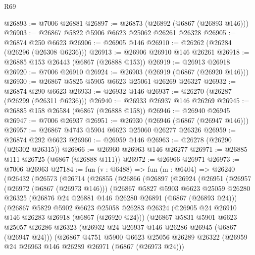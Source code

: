 \begin{lexlean}{R69}
\begin{coremodule}
{@26893 := @7006 @26881
@26897 := @26873 (@26892 (@6867 (@26893 @146)))
@26903 := @26867 @5822 @5906 @6623 @25062 @26261 @26328
@26905 := @26874 @250 @6623
@26906 := @26905 @146
@26910 := @26262 (@26284 (@26296 (@26308 @6236)))
@26913 := @26906 @26910 @146 @26261
@26918 := @26885 @153 @26443 (@6867 (@26888 @153))
@26919 := @26913 @26918
@26920 := @7006 @26910
@26924 := @26903 (@26919 (@6867 (@26920 @146)))
@26930 := @26867 @5825 @5905 @6623 @25061 @26269 @26327
@26932 := @26874 @290 @6623
@26933 := @26932 @146
@26937 := @26270 (@26287 (@26299 (@26311 @6236)))
@26940 := @26933 @26937 @146 @26269
@26945 := @26885 @158 @26584 (@6867 (@26888 @158))
@26946 := @26940 @26945
@26947 := @7006 @26937
@26951 := @26930 (@26946 (@6867 (@26947 @146)))
@26957 := @26867 @4743 @5904 @6623 @25060 @26277 @26326
@26959 := @26874 @292 @6623
@26960 := @26959 @146
@26963 := @26278 (@26290 (@26302 @26315))
@26966 := @26960 @26963 @146 @26277
@26971 := @26885 @111 @26725 (@6867 (@26888 @111))
@26972 := @26966 @26971
@26973 := @7006 @26963
@27184 := fun (v : @6488) =>
  fun (m : @6404) =>
  @26240
    (@26432
      (@26573
        (@26714
          (@26855
            (@26866
              (@26897
                (@26924
                  (@26951
                    (@26957
                      (@26972 (@6867 (@26973 @146)))
                      (@26867
                        @5827
                        @5903
                        @6623
                        @25059
                        @26280
                        @26325
                        (@26876 @24 @26881 @146 @26280 @26891 (@6867 (@26893 @24)))
                        (@26867
                          @5829
                          @5902
                          @6623
                          @25058
                          @26283
                          @26324
                          (@26905 @24 @26910 @146 @26283 @26918 (@6867 (@26920 @24)))
                          (@26867
                            @5831
                            @5901
                            @6623
                            @25057
                            @26286
                            @26323
                            (@26932 @24 @26937 @146 @26286 @26945 (@6867 (@26947 @24)))
                            (@26867
                              @4751
                              @5900
                              @6623
                              @25056
                              @26289
                              @26322
                              (@26959 @24 @26963 @146 @26289 @26971 (@6867 (@26973 @24)))
}
\end{coremodule}
\end{lexlean}
